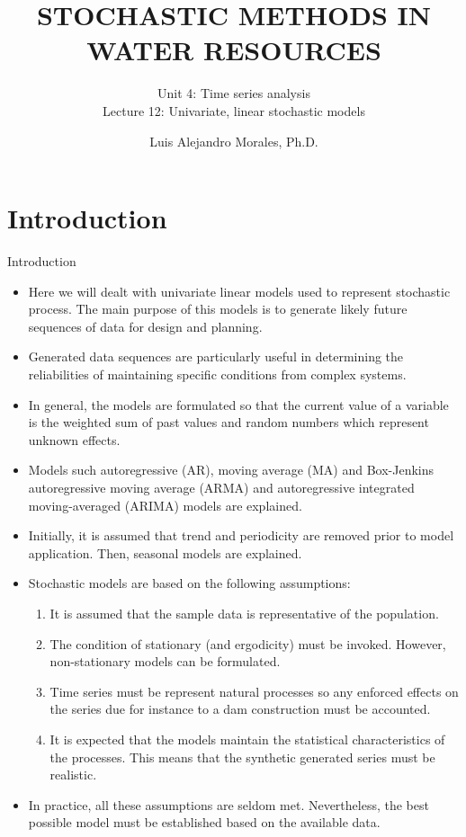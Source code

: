 \documentclass[8pt]{beamer}
\title{STOCHASTIC METHODS IN WATER RESOURCES}
\subtitle{Unit 4: Time series analysis \\ Lecture 12: Univariate, linear stochastic models}
\author{Luis Alejandro Morales, Ph.D.}
\institute{Universidad Nacional de Colombia \\ Department of Civil and Agriculture Engineering} %
\renewcommand{\emph}[1]{\textcolor{myorange}{#1}}
\begin{document}
\begin{frame}
    \titlepage
\end{frame}

\section{Introduction}
\begin{frame}{Introduction}
    \begin{itemize}
        \item Here we will dealt with \alert{univariate linear models} used to represent \emph{stochastic process}. The main purpose of this models is to generate likely \emph{future sequences of data} for \emph{design} and \emph{planning}.
        \item \emph{Generated data sequences} are particularly useful in determining the \emph{reliabilities} of maintaining \emph{specific conditions} from complex systems.
        \item In general, the models are formulated so that the current value of a variable is the \emph{weighted sum} of \emph{past values} and \emph{random numbers} which represent unknown effects. 
    \item Models such \emph{autoregressive (AR)}, \emph{moving average (MA)} and \emph{Box-Jenkins autoregressive moving average (ARMA)} and \emph{autoregressive integrated moving-averaged (ARIMA)} models are explained.
        \item Initially, it is assumed that \emph{trend} and \emph{periodicity} are removed prior to model application. Then, \emph{seasonal models} are explained.
        \item \emph{Stochastic models} are based on the following assumptions:
            \begin{enumerate}
                \item It is assumed that the \emph{sample data} is representative of the population.
                \item The condition of \emph{stationary} (and \emph{ergodicity}) must be invoked. However, \emph{non-stationary} models can be formulated.
                \item Time series must be represent \emph{natural processes} so any enforced effects on the series due for instance to a dam construction must be accounted. 
      \item It is expected that the models maintain the statistical characteristics of the processes. This means that the synthetic generated series must be realistic. 
            \end{enumerate}
        \item In practice, all these assumptions are seldom met. Nevertheless, the best possible model must be established based on the available data. 
    \end{itemize}
\end{frame}
\end{document}
